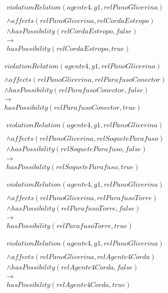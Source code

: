 \documentclass[12pt]{article}
\begin{document}
\begin{eqnarray}\nonumber
	violationRelation(agente4,g1,relPanoGlicerina)  \nonumber \\ 
	\nonumber \\ 
	\wedge affects(relPanoGlicerina,relCordaEstropo)   \nonumber \\ 
	\wedge hasPossibility(relCordaEstropo,false) \nonumber \\  
	\to \nonumber \\  
	hasPossibility(relCordaEstropo,true) 
\end{eqnarray}

\begin{eqnarray}\nonumber
	violationRelation(agente4,g1,relPanoGlicerina)  \nonumber \\ 
	\nonumber \\ 
	\wedge affects(relPanoGlicerina,relParafusoConector)   \nonumber \\ 
	\wedge hasPossibility(relParafusoConector,false) \nonumber \\  
	\to \nonumber \\  
	hasPossibility(relParafusoConector,true) 
\end{eqnarray}

\begin{eqnarray}\nonumber
	violationRelation(agente4,g1,relPanoGlicerina)  \nonumber \\ 
	\nonumber \\ 
	\wedge affects(relPanoGlicerina,relSoqueteParafuso)   \nonumber \\ 
	\wedge hasPossibility(relSoqueteParafuso,false) \nonumber \\  
	\to \nonumber \\  
	hasPossibility(relSoqueteParafuso,true) 
\end{eqnarray}

\begin{eqnarray}\nonumber
	violationRelation(agente4,g1,relPanoGlicerina)  \nonumber \\ 
	\nonumber \\ 
	\wedge affects(relPanoGlicerina,relParafusoTorre)   \nonumber \\ 
	\wedge hasPossibility(relParafusoTorre,false) \nonumber \\  
	\to \nonumber \\  
	hasPossibility(relParafusoTorre,true) 
\end{eqnarray}

\begin{eqnarray}\nonumber
	violationRelation(agente4,g1,relPanoGlicerina)  \nonumber \\ 
	\nonumber \\ 
	\wedge affects(relPanoGlicerina,relAgente4Corda)   \nonumber \\ 
	\wedge hasPossibility(relAgente4Corda,false) \nonumber \\  
	\to \nonumber \\  
	hasPossibility(relAgente4Corda,true) 
\end{eqnarray}
\end{document}
